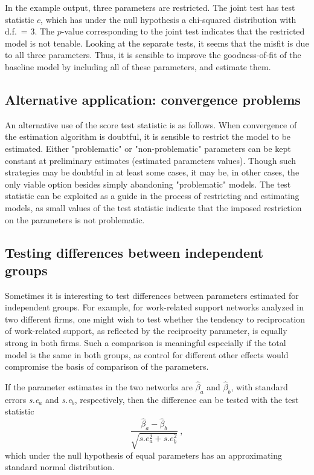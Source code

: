 \documentclass[a4paper,fleqn,11pt]{article}
\newcommand{\+}{\, + \,}
\begin{document}
In the example output, three parameters are restricted.
The joint test has test statistic $c$, which has under the
null hypothesis a chi-squared distribution with d.f.\ = 3.
The $p$-value corresponding to the joint test indicates
that the restricted model is not tenable. Looking at the separate
tests, it seems that the misfit is due to all three parameters.
Thus, it is sensible to improve
the goodness-of-fit of the baseline model by including all of these parameters,
and estimate them.

\subsection{Alternative application: convergence problems}
\label{alternative}

An alternative use of the score test statistic is as follows. When
convergence of the estimation algorithm is doubtful, it is sensible
to restrict the model to be estimated. Either "problematic" or
"non-problematic" parameters can be kept constant at preliminary
estimates (estimated parameters values). Though such strategies may
be doubtful in at least some cases, it may be, in other cases, the
only viable option besides simply abandoning "problematic" models.
The test statistic can be exploited as a guide in the process of
restricting and estimating models, as small values of the test
statistic indicate that the imposed restriction on the parameters is
not problematic.

\subsection{Testing differences between independent groups}

Sometimes it is interesting to test differences between parameters estimated for
independent groups. For example, for work-related support networks analyzed in
two different firms, one might wish to test whether the tendency to
reciprocation of work-related support, as reflected by the reciprocity
parameter, is equally strong in both firms.  Such a comparison is meaningful
especially if the total model is the same in both groups, as control for
different other effects would compromise the basis of comparison of the
parameters.

If the parameter estimates in the two networks are $\hat\beta_a$ and $\hat\beta_b$,
with standard errors \textit{s.e}$_a$ and  \textit{s.e}$_b$, respectively,
then the difference can be tested with the test statistic
\begin{equation}
    \frac{\hat\beta_a  - \hat\beta_b}{\sqrt{s.e_a^2 + s.e_b^2}} \ ,
\end{equation}
which under the null hypothesis of equal parameters has an approximating
standard normal distribution.
\end{document}
